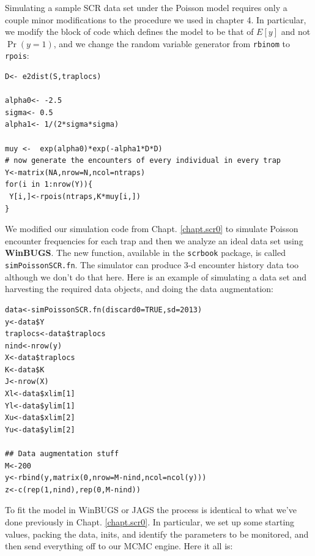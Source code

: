 Simulating a sample SCR data set under the Poisson model requires only
a couple minor modifications to the procedure we used in chapter 4. In
particular, we modify the block of code which defines the model to be
that of $E[y]$ and not $\Pr(y=1)$, and we change the random variable
generator from \mbox{\tt rbinom} to \mbox{\tt rpois}:
{\small
\begin{verbatim}
D<- e2dist(S,traplocs)

alpha0<- -2.5
sigma<- 0.5
alpha1<- 1/(2*sigma*sigma)

muy <-  exp(alpha0)*exp(-alpha1*D*D)
# now generate the encounters of every individual in every trap
Y<-matrix(NA,nrow=N,ncol=ntraps)
for(i in 1:nrow(Y)){
 Y[i,]<-rpois(ntraps,K*muy[i,])
}
\end{verbatim}
}

We modified our simulation code from Chapt. \ref{chapt.scr0} 
to simulate Poisson
encounter frequencies for each trap and then we analyze an ideal data
set using {\bf WinBUGS}. The new function, available in the \mbox{\tt scrbook}
package, is called
{\tt simPoissonSCR.fn}. 
The simulator can produce 3-d encounter history data too although we
don't do that here. 
Here is an example of simulating a data set and harvesting the
required data objects, and doing the data augmentation:

{\small
\begin{verbatim}
data<-simPoissonSCR.fn(discard0=TRUE,sd=2013)
y<-data$Y
traplocs<-data$traplocs
nind<-nrow(y)
X<-data$traplocs
K<-data$K
J<-nrow(X)
Xl<-data$xlim[1]
Yl<-data$ylim[1]
Xu<-data$xlim[2]
Yu<-data$ylim[2]

## Data augmentation stuff
M<-200
y<-rbind(y,matrix(0,nrow=M-nind,ncol=ncol(y)))
z<-c(rep(1,nind),rep(0,M-nind))
\end{verbatim}
}


To fit the model in WinBUGS or JAGS the process is identical to what we've done 
previously in Chapt. \ref{chapt.scr0}. In particular, we set up some
starting values, packing the data, inits, and identify the parameters
to be monitored, and then send everything off to our MCMC engine. Here it all is:

